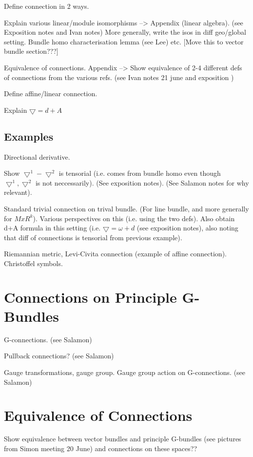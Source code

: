 \documentclass[a4paper]{article}
\theoremstyle{definition} \newtheorem*{definition}{Definition}
\theoremstyle{definition} \newtheorem*{definitions}{Definitions}
\theoremstyle{plain} \newtheorem{theorem}{Theorem}[section]
\theoremstyle{plain} \newtheorem{proposition}[theorem]{Proposition}
\theoremstyle{plain} \newtheorem{corollary}[theorem]{Corollary}
\theoremstyle{plain} \newtheorem{lemma}[theorem]{Lemma}
\theoremstyle{plain} \newtheorem{example}[theorem]{Example}
\begin{document}
Define connection in 2 ways.

Explain various linear/module isomorphisms --> Appendix (linear algebra). (see Exposition notes and Ivan notes)
More generally, write the isos in diff geo/global setting. Bundle homo characterisation lemma (see Lee) etc. [Move this to vector bundle section???] 

Equivalence of connections. 
Appendix --> Show equivalence of 2-4 different defs of connections from the various refs.  (see Ivan notes 21 june and exposition )

Define affine/linear connection.

Explain $\bigtriangledown = d +A$

\subsection{Examples}

Directional derivative.

Show $\bigtriangledown^1 - \bigtriangledown^2$ is tensorial (i.e. comes from bundle homo even though $\bigtriangledown^1,  \bigtriangledown^2$ is not neccessarily). (See exposition notes). (See Salamon notes for why relevant).

Standard trivial connection on trival bundle. (For line bundle, and more generally for $MxR^k$). Various perspectives on this (i.e. using the two defs). Also obtain d+A formula in this setting (i.e. $\bigtriangledown = \omega + d$ (see exposition notes), also noting that diff of connections is tensorial from previous example).

Riemannian metric, Levi-Civita connection (example of affine connection). Christoffel symbols.

\section{Connections on Principle G-Bundles}

G-connections. (see Salamon)

Pullback connections? (see Salamon)

Gauge transformations, gauge group. Gauge group action on G-connections. (see Salamon)

\section{Equivalence of Connections}
Show equivalence between vector bundles and principle G-bundles (see pictures from Simon meeting 20 June)
and connections on these spaces??
\end{document}
